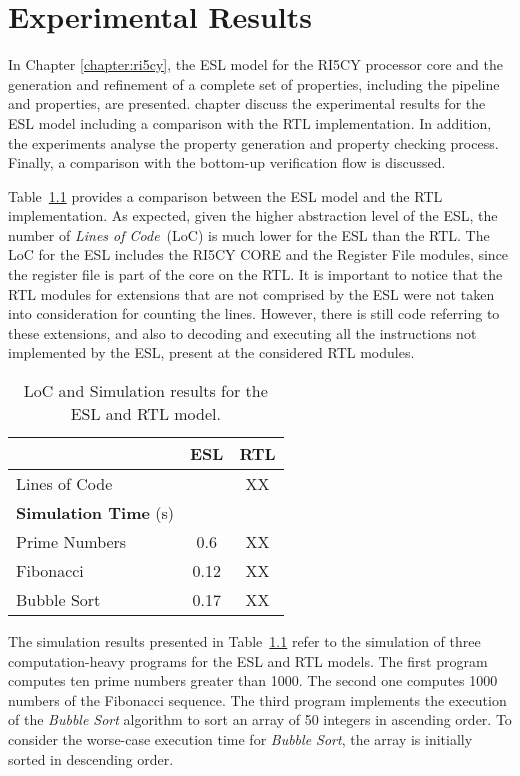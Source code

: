 \chapter{Experimental Results}

In Chapter \ref{chapter:ri5cy}, the ESL model for the RI5CY processor core and the generation and refinement of a complete set of properties, including the pipeline and \SSQED{} properties, are presented.  chapter  discuss the experimental results for the ESL model including a comparison with the RTL implementation. In addition, the experiments analyse the property generation and property checking process. Finally, a comparison with the bottom-up verification flow is discussed.

Table~\ref{tab:esl-rtl-comp} provides a comparison between the ESL model and the RTL implementation. As expected, given the higher abstraction level of the ESL, the number of \textit{Lines of Code}~(LoC) is much lower for the ESL than the RTL. The LoC for the ESL includes the RI5CY CORE and the Register File modules, since the register file is part of the core on the RTL. It is important to notice that the RTL modules for extensions that are not comprised by the ESL were not taken into consideration for counting the lines. However, there is still code referring to these extensions, and also to decoding and executing all the instructions not implemented by the ESL, present at the considered RTL modules.

\begin{table}[htb!] 
	\centering 
	\caption{LoC and Simulation results for the ESL and RTL model.} 
	\label{tab:esl-rtl-comp}
	\begin{tabular}{p{5cm} c c} 
		  &  \textbf{ESL} & \textbf{RTL} \\     
		\hline	
		Lines of Code  &  \SSSAY{XX} & XX \\
		\hline
		\textbf{Simulation Time} (s) & & \\
		\hline
		Prime Numbers  &  0.6 & XX \\
		Fibonacci  &  0.12 & XX \\
		Bubble Sort  &  0.17 & XX \\
	\end{tabular} 
\end{table}

The simulation results presented in Table~\ref{tab:esl-rtl-comp} refer to the simulation of three computation-heavy programs for the ESL and RTL models. The first program computes ten prime numbers greater than 1000. The second one computes 1000 numbers of the Fibonacci sequence. The third program implements the execution of the \textit{Bubble Sort} algorithm to sort an array of 50 integers in ascending order. To consider the worse-case execution time for \textit{Bubble Sort}, the array is initially sorted in descending order.

